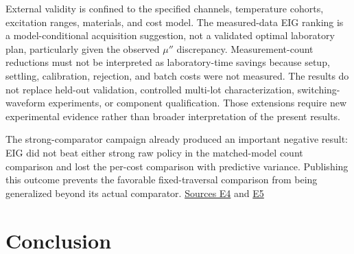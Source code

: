 External validity is confined to the specified channels, temperature
cohorts, excitation ranges, materials, and cost model. The measured-data
EIG ranking is a model-conditional acquisition suggestion, not a
validated optimal laboratory plan, particularly given the observed
\(\mu''\) discrepancy. Measurement-count reductions must not be
interpreted as laboratory-time savings because setup, settling,
calibration, rejection, and batch costs were not measured. The results
do not replace held-out validation, controlled multi-lot
characterization, switching-waveform experiments, or component
qualification. Those extensions require new experimental evidence rather
than broader interpretation of the present results.

The strong-comparator campaign already produced an important negative
result: EIG did not beat either strong raw policy in the matched-model
count comparison and lost the per-cost comparison with predictive
variance. Publishing this outcome prevents the favorable fixed-traversal
comparison from being generalized beyond its actual comparator.
\href{https://github.com/hoangduong6210/EIG-bayesian-for-Recover-potential-Physical-Parameter-of-MagComponent/blob/927bbcb6d0b862598fae87d2575a872bbd79b5f1/wiki/evidence/Evidence-Sources.md\#e4}{Sources
E4} and
\href{https://github.com/hoangduong6210/EIG-bayesian-for-Recover-potential-Physical-Parameter-of-MagComponent/blob/927bbcb6d0b862598fae87d2575a872bbd79b5f1/wiki/evidence/Evidence-Sources.md\#e5}{E5}

\hypertarget{conclusion}{%
\section{Conclusion}\label{conclusion}}

